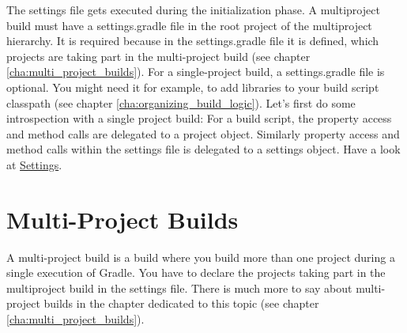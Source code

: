 The settings file gets executed during the initialization phase. A multiproject build must have a settings.gradle file in the root project of the multiproject hierarchy. It is required because in the settings.gradle file it is defined, which projects are taking part in the multi-project build (see chapter \ref{cha:multi_project_builds}). For a single-project build, a settings.gradle file is optional. You might need it for example, to add libraries to your build script classpath (see chapter \ref{cha:organizing_build_logic}). Let's first do some introspection with a single project build:
For a build script, the property access and method calls are delegated to a project object. Similarly property access and method calls within the settings file is delegated to a settings object. Have a look at \href{\API Settings.html}{\PKG Settings}.

\section{Multi-Project Builds} %
\label{sec:multi_project_builds}
A multi-project build is a build where you build more than one project during a single execution of Gradle. You have to declare the projects taking part in the multiproject build in the settings file. 
There is much more to say about multi-project builds in the chapter dedicated to this topic (see chapter \ref{cha:multi_project_builds}). 

